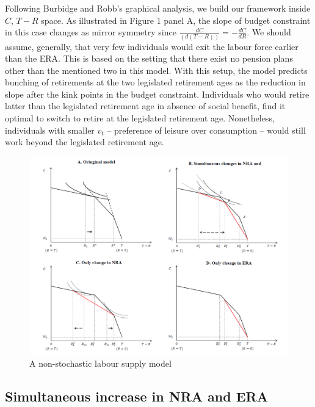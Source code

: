 \documentclass[a4paper]{article}
\begin{document}
Following Burbidge and Robb’s graphical analysis, we build our framework inside $C$, $T-R$ space. As illustrated in Figure 1 panel A, the slope of budget constraint in this case changes as mirror symmetry since $\frac{dC}{(d(T-R))}=-\frac{dC}{dR}$. We should assume, generally, that very few individuals would exit the labour force earlier than the ERA. This is based on the setting that there exist no pension plans other than the mentioned two in this model. With this setup, the model predicts bunching of retirements at the two legislated retirement ages as the reduction in slope after the kink points in the budget constraint. Individuals who would retire latter than the legislated retirement age in absence of social benefit, find it optimal to switch to retire at the legislated retirement age. Nonetheless, individuals with smaller  $v_t$ – preference of leisure over consumption – would still work beyond the legislated retirement age.

\begin{figure}[h] 
    \centering
    \includegraphics[width=1\linewidth]{Figure1.png}
    \caption{A non-stochastic labour supply model}
    \label{1}
\end{figure}

\subsection{Simultaneous increase in NRA and ERA}
\end{document}
